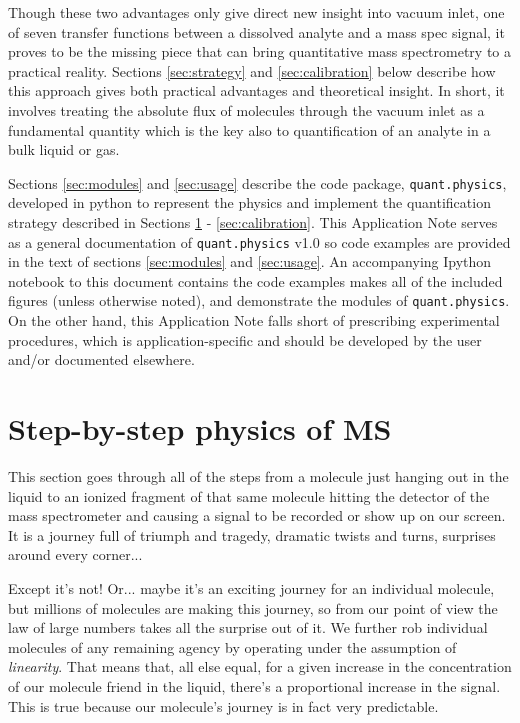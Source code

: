 \documentclass{article}
\newcommand{\code}[1]{\colorbox{codegray}{\lstinline{#1}}}
\begin{document}
Though these two advantages only give direct new insight into vacuum inlet, one of seven transfer functions between a dissolved analyte and a mass spec signal, it proves to be the missing piece that can bring quantitative mass spectrometry to a practical reality. Sections \ref{sec:strategy} and \ref{sec:calibration} below describe how this approach gives both practical advantages and theoretical insight. In short, it involves treating the absolute flux of molecules through the vacuum inlet as a fundamental quantity which is the key also to quantification of an analyte in a bulk liquid or gas. 

Sections \ref{sec:modules} and \ref{sec:usage} describe the code package, \texttt{quant.physics}, developed in python to represent the physics and implement the quantification strategy described in Sections \ref{sec:steps} - \ref{sec:calibration}. This Application Note serves as a general documentation of \code{quant.physics} v1.0 so code examples are provided in the text of sections \ref{sec:modules} and \ref{sec:usage}. An accompanying Ipython notebook to this document contains the code examples makes all of the included figures (unless otherwise noted), and demonstrate the modules of \code{quant.physics}. On the other hand, this Application Note falls short of prescribing experimental procedures, which is application-specific and should be developed by the user and/or documented elsewhere. 



\section{Step-by-step physics of MS} \label{sec:steps}
This section goes through all of the steps from a molecule just hanging out in the liquid to an ionized fragment of that same molecule hitting the detector of the mass spectrometer and causing a signal to be recorded or show up on our screen. It is a journey full of triumph and tragedy, dramatic twists and turns, surprises around every corner...

Except it's not! Or... maybe it's an exciting journey for an individual molecule, but millions of molecules are making this journey, so from our point of view the law of large numbers takes all the surprise out of it. We further rob individual molecules of any remaining agency by operating under the assumption of \textit{linearity}. That means that, all else equal, for a given increase in the concentration of our molecule friend in the liquid, there's a proportional increase in the signal. This is true because our molecule's journey is in fact very predictable.
\end{document}
